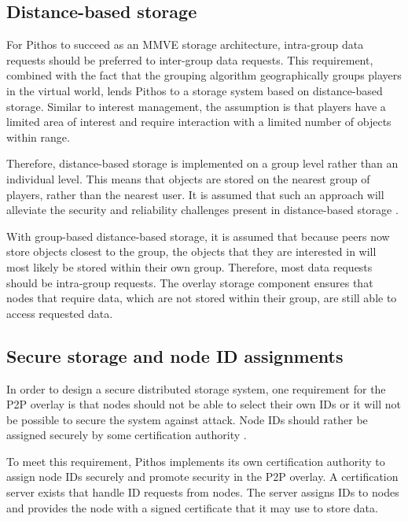 \subsection{Distance-based storage}
\label{distance_based}

For Pithos to succeed as an MMVE storage architecture, intra-group data requests should be preferred to inter-group data requests. This requirement,
combined with the fact that the grouping algorithm geographically groups players in the virtual world, lends Pithos to a storage system based on
distance-based storage. Similar to interest management, the assumption is that players have a limited area of interest and require interaction with a
limited number of objects within range.

Therefore, distance-based storage is implemented on a group level rather than an individual level. This means that objects are stored on the nearest
group of players, rather than the nearest user. It is assumed that such an approach will alleviate the security and reliability challenges present in
distance-based storage \cite{gilmore_p2p_mmog_state_persistency}.

With group-based distance-based storage, it is assumed that because peers now store objects closest to the group, the objects that they are
interested in will most likely be stored within their own group. Therefore, most data requests should be intra-group requests. The overlay storage
component ensures that nodes that require data, which are not stored within their group, are still able to access requested data.

\subsection{Secure storage and node ID assignments}
\label{secure_ids}

In order to design a secure distributed storage system, one requirement for the P2P overlay is that nodes should not be able to select their own IDs
or it will not be possible to secure the system against attack. Node IDs should rather be assigned securely by some certification authority
\cite{secure_overlay_routing}.

To meet this requirement, Pithos implements its own certification authority to assign node IDs securely and promote security in the P2P overlay. A
certification server exists that handle ID requests from nodes. The server assigns IDs to nodes and provides the node with a signed certificate that
it may use to store data.

